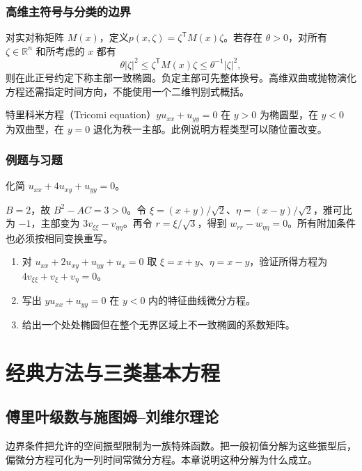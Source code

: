 \documentclass[UTF8,12pt,a4paper,fontset=fandol]{ctexbook}
\begin{document}
\section{高维主符号与分类的边界}
对实对称矩阵 $M(x)$，定义$p(x,\zeta)=\zeta^{\mathsf T}M(x)\zeta$。若存在 $\theta>0$，对所有 $\zeta\in\mathbb R^n$ 和所考虑的 $x$ 都有
\[
 \theta|\zeta|^2\le\zeta^{\mathsf T}M(x)\zeta\le\theta^{-1}|\zeta|^2,
\]
则在此正号约定下称主部一致椭圆。负定主部可先整体换号。高维双曲或抛物演化方程还需指定时间方向，不能使用一个二维判别式概括。

特里科米方程（Tricomi equation）$y u_{xx}+u_{yy}=0$ 在 $y>0$ 为椭圆型，在 $y<0$ 为双曲型，在 $y=0$ 退化为秩一主部。此例说明方程类型可以随位置改变。

\section{例题与习题}
\begin{example}
化简 $u_{xx}+4u_{xy}+u_{yy}=0$。
\end{example}
\begin{solve}
$B=2$，故 $B^2-AC=3>0$。令 $\xi=(x+y)/\sqrt2$、$\eta=(x-y)/\sqrt2$，雅可比为 $-1$，主部变为 $3v_{\xi\xi}-v_{\eta\eta}$。再令 $r=\xi/\sqrt3$，得到 $w_{rr}-w_{\eta\eta}=0$。所有附加条件也必须按相同变换重写。
\end{solve}
\begin{enumerate}
 \item 对 $u_{xx}+2u_{xy}+u_{yy}+u_x=0$ 取 $\xi=x+y$、$\eta=x-y$，验证所得方程为 $4v_{\xi\xi}+v_\xi+v_\eta=0$。
 \item 写出 $y u_{xx}+u_{yy}=0$ 在 $y<0$ 内的特征曲线微分方程。
 \item 给出一个处处椭圆但在整个无界区域上不一致椭圆的系数矩阵。
\end{enumerate}

\part{经典方法与三类基本方程}

\chapter{傅里叶级数与施图姆--刘维尔理论}
\label{chap:fourier-series}

边界条件把允许的空间振型限制为一族特殊函数。把一般初值分解为这些振型后，偏微分方程可化为一列时间常微分方程。本章说明这种分解为什么成立。
\end{document}

